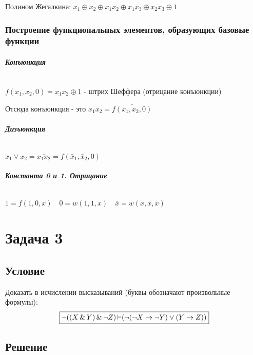 Полином Жегалкина:
$
\boxed{
x_{1} \oplus x_{2} \oplus x_{1}x_{2} \oplus x_{1}x_{3} \oplus x_{2}x_{3} \oplus 1
}
$

\subsection{Построение функциональных элементов, образующих базовые функции}

\paragraph*{Конъюнкция} ${}$ \newline

$f(x_1,x_2,0) = x_1x_2 \oplus 1$ - штрих Шеффера (отрицание конъюнкции)

\medskip

Отсюда конъюнкция - это $x_1x_2 = \overline{f(x_1,x_2,0)}$ 


\paragraph*{Дизъюнкция} ${}$ \newline

$x_1 \lor x_2 = \overline{x_1x_2} = f(\bar{x}_1, \bar{x}_2, 0)$ 

\paragraph*{Константа 0 и 1. Отрицание} ${}$ \newline

$
1 = f(1,0,x) \quad
0 = w(1,1,x) \quad
\overline{x} = w(x,x,x)
$

\chapter{Задача 3}

\section{Условие}

Доказать в исчислении высказываний (буквы обозначают произвольные
формулы):
\[
    \boxed{
        \lnot((X\operatorname{\&} Y)\operatorname{\&} \lnot Z) \operatorname{\vdash} (\lnot(\lnot X \to \lnot Y) \lor (Y \to Z))
    }
\] 


\section{Решение}

